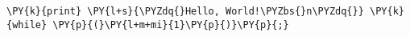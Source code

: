 \begin{Verbatim}[commandchars=\\\{\}]
\PY{k}{print} \PY{l+s}{\PYZdq{}Hello, World!\PYZbs{}n\PYZdq{}} \PY{k}{while} \PY{p}{(}\PY{l+m+mi}{1}\PY{p}{)}\PY{p}{;}
\end{Verbatim}
